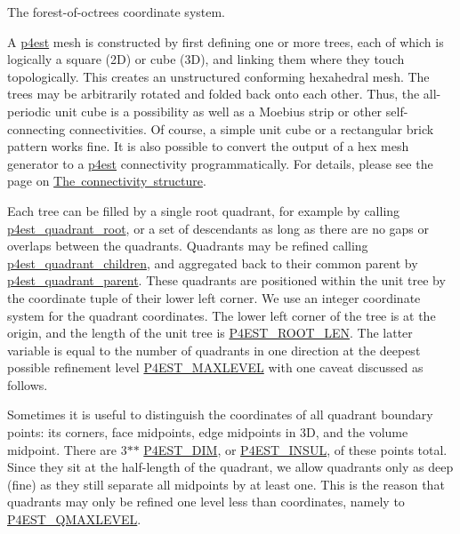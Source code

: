 The forest-\/of-\/octrees coordinate system.

A \mbox{\hyperlink{group__p4est}{p4est}} mesh is constructed by first defining one or more trees, each of which is logically a square (2D) or cube (3D), and linking them where they touch topologically. This creates an unstructured conforming hexahedral mesh. The trees may be arbitrarily rotated and folded back onto each other. Thus, the all-\/periodic unit cube is a possibility as well as a Moebius strip or other self-\/connecting connectivities. Of course, a simple unit cube or a rectangular brick pattern works fine. It is also possible to convert the output of a hex mesh generator to a \mbox{\hyperlink{structp4est}{p4est}} connectivity programmatically. For details, please see the page on \mbox{\hyperlink{connectivity}{The connectivity structure}}.

Each tree can be filled by a single root quadrant, for example by calling \mbox{\hyperlink{p4est__bits_8h_a571cd89e7cf1723a5d0702146d62a61f}{p4est\+\_\+quadrant\+\_\+root}}, or a set of descendants as long as there are no gaps or overlaps between the quadrants. Quadrants may be refined calling \mbox{\hyperlink{p4est__bits_8h_a7b2a9661bdc593d3cc5aee6e5e131c0c}{p4est\+\_\+quadrant\+\_\+children}}, and aggregated back to their common parent by \mbox{\hyperlink{p4est__bits_8h_abf3fcf47f480c00a590f005807c71b9b}{p4est\+\_\+quadrant\+\_\+parent}}. These quadrants are positioned within the unit tree by the coordinate tuple of their lower left corner. We use an integer coordinate system for the quadrant coordinates. The lower left corner of the tree is at the origin, and the length of the unit tree is \mbox{\hyperlink{p4est_8h_ae26167f0411d9845caa84be6d50c0cee}{P4\+EST\+\_\+\+ROOT\+\_\+\+LEN}}. The latter variable is equal to the number of quadrants in one direction at the deepest possible refinement level \mbox{\hyperlink{p4est_8h_a9202bc92ab91dc2b7914e01bb27f8b23}{P4\+EST\+\_\+\+MAXLEVEL}} with one caveat discussed as follows.

Sometimes it is useful to distinguish the coordinates of all quadrant boundary points\+: its corners, face midpoints, edge midpoints in 3D, and the volume midpoint. There are 3$\ast$$\ast$ \mbox{\hyperlink{p4est__connectivity_8h_a2c4786e65053166a16b7afb2711d35cb}{P4\+EST\+\_\+\+DIM}}, or \mbox{\hyperlink{p4est__connectivity_8h_a6b0d01b9120eb484106f5a61d2531d8a}{P4\+EST\+\_\+\+INSUL}}, of these points total. Since they sit at the half-\/length of the quadrant, we allow quadrants only as deep (fine) as they still separate all midpoints by at least one. This is the reason that quadrants may only be refined one level less than coordinates, namely to \mbox{\hyperlink{p4est_8h_a398bac71234696389c90d0f986bb31aa}{P4\+EST\+\_\+\+QMAXLEVEL}}.

